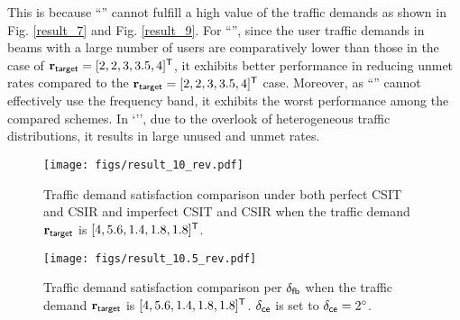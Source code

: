 \documentclass[draftclsnofoot, onecolumn, comsoc, 12pt]{IEEEtran}
\begin{document}
This is because ``{}'' cannot fulfill a high value of the traffic demands as shown in Fig. \ref{result_7} and  Fig. \ref{result_9}.
{For ``{}'', since the user traffic demands in beams with a large number of users are comparatively lower than those in the case of $\mathbf{r}_{\sf{target}} = [2,2,3,3.5,4]^{\sf{T}}$, it exhibits better performance in reducing unmet rates compared to the $\mathbf{r}_{\sf{target}} = [2,2,3,3.5,4]^{\sf{T}}$ case.}
Moreover, as ``{}'' cannot effectively use the frequency band, it exhibits the worst performance among the compared schemes.
In `{}'', due to the overlook of heterogeneous traffic distributions, it results in large {unused} and {unmet rates}.



\begin{figure}[!t]
\centering
 		\texttt{[image: figs/result\_10\_rev.pdf]}%
 		\caption{{Traffic demand satisfaction comparison under both perfect CSIT and CSIR and imperfect CSIT and CSIR when the traffic demand $\mathbf{r}_{\sf{target}}$ is $[4, 5.6, 1.4, 1.8, 1.8]^{\sf{T}}$.}}
    	\label{result_11} %
\end{figure}

\begin{figure}[!t]
\centering
 		\texttt{[image: figs/result\_10.5\_rev.pdf]}%
 		\caption{{Traffic demand satisfaction comparison per $\delta_{\sf{fb}}$ when the traffic demand $\mathbf{r}_{\sf{target}}$ is $[4, 5.6, 1.4, 1.8, 1.8]^{\sf{T}}$. $\delta_{\sf{ce}}$ is set to  $\delta_{\sf{ce}}=2^{\circ}$.}}
    	\label{result_12} %
\end{figure}
\end{document}
